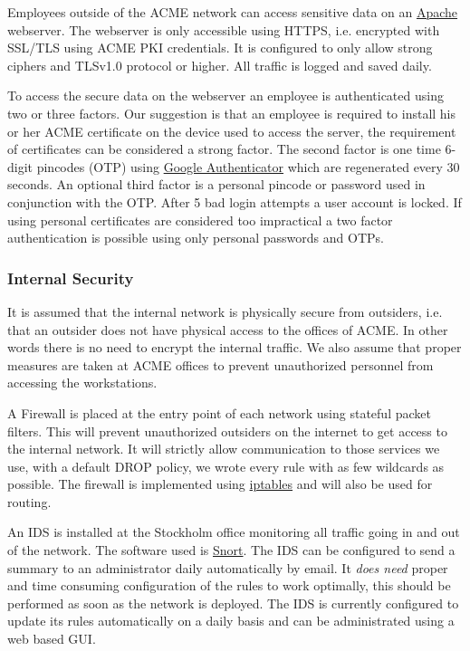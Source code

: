 Employees outside of the ACME network can access sensitive data on an \href{http://httpd.apache.org/}{Apache} webserver. The webserver is only accessible using HTTPS, i.e. encrypted with SSL/TLS using ACME PKI credentials. It is configured to only allow strong ciphers and TLSv1.0 protocol or higher. All traffic is logged and saved daily. 

To access the secure data on the webserver an employee is authenticated using two or three factors. Our suggestion is that an employee is required to install his or her ACME certificate on the device used to access the server, the requirement of certificates can be considered a strong factor. The second factor is one time 6-digit pincodes (OTP) using \href{http://en.wikipedia.org/wiki/Google_Authenticator}{Google Authenticator} which are regenerated every 30 seconds. An optional third factor is a personal pincode or password used in conjunction with the OTP. After 5 bad login attempts a user account is locked. If using personal certificates are considered too impractical a two factor authentication is possible using only personal passwords and OTPs.

\subsubsection*{Internal Security}

It is assumed that the internal network is physically secure from outsiders, i.e. that an outsider does not have physical access to the offices of ACME. In other words there is no need to encrypt the internal traffic. We also assume that proper measures are taken at ACME offices to prevent unauthorized personnel from accessing the workstations.

A Firewall is placed at the entry point of each network using stateful packet filters. This will prevent unauthorized outsiders on the internet to get access to the internal network. It will strictly allow communication to those services we use, with a default DROP policy, we wrote every rule with as few wildcards as possible. The firewall is implemented using \href{http://en.wikipedia.org/wiki/Iptables}{iptables} and will also be used for routing.


An IDS is installed at the Stockholm office monitoring all traffic going in and out of the network. The software used is \href{HTTPS://www.snort.org/}{Snort}. The IDS can be configured to send a summary to an administrator daily automatically by email. It \emph{does need} proper and time consuming configuration of the rules to work optimally, this should be performed as soon as the network is deployed. The IDS is currently configured to update its rules automatically on a daily basis and can be administrated using a web based GUI.

